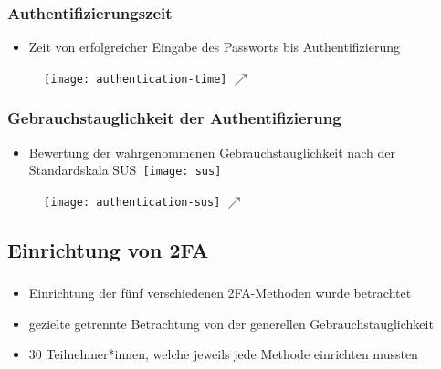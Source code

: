 \begin{frame}
    \frametitle{Authentifizierungszeit}

    \begin{itemize}
        \item Zeit von erfolgreicher Eingabe des Passworts bis Authentifizierung
    \end{itemize}


    \begin{figure}[c]
        \texttt{[image: authentication-time]}
        \(\nearrow \)
    \end{figure}

\end{frame}

\begin{frame}
    \frametitle{Gebrauchstauglichkeit der Authentifizierung}

    \begin{itemize}
        \item Bewertung der wahrgenommenen Gebrauchstauglichkeit nach der Standardskala SUS\,
        \texttt{[image: sus]}
        \tiny{\textcolor{white}{}}
    \end{itemize}

    \begin{figure}[¢]
        \texttt{[image: authentication-sus]}
        \(\nearrow \)
    \end{figure}


\end{frame}

\subsection{Einrichtung von 2FA}
\begin{frame}
    \frametitle{\currentsectionname}

    \begin{itemize}
        \item Einrichtung der fünf verschiedenen 2FA-Methoden wurde betrachtet
        \item gezielte getrennte Betrachtung von der generellen Gebrauchstauglichkeit
        \item 30 Teilnehmer*innen, welche jeweils jede Methode einrichten mussten
    \end{itemize}

\end{frame}

